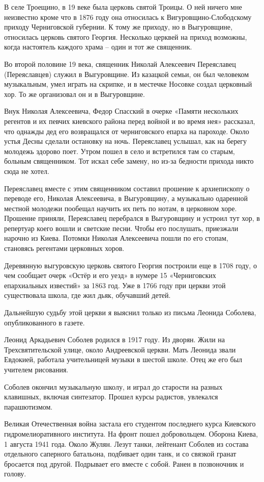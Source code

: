 В селе Троещино, в 19 веке была церковь святой Троицы. О ней ничего мне неизвестно кроме что в 1876 году она относилась к Вигуровщино-Слободскому приходу Черниговской губернии. К тому же приходу, но в Выгуровщине, относилась церковь святого Георгия. Несколько церквей на приход возможны, когда настоятель каждого храма – один и тот же священник.

Во второй половине 19 века, священник Николай Алексеевич Переяславец (Переяславцев) служил в Выгуровщине. Из казацкой семьи, он был человеком музыкальным, умел играть на скрипке, и в местечке Носовке создал церковный хор. То же организовал он и в Выгуровщине. 

Внук Николая Алексеевича, Федор Спасский в очерке «Памяти нескольких регентов и их певчих киевского района перед войной и во время нея» рассказал, что однажды дед его возвращался от черниговского епарха на пароходе. Около устья Десны сделали остановку на ночь. Переяславец услышал, как на берегу молодежь здорово поет. Утром пошел в село и встретился там со старым, больным священником. Тот искал себе замену, но из-за бедности прихода никто сюда не хотел. 

Переяславец вместе с этим священником составил прошение к архиепископу о переводе его, Николая Алексеевича, в Выгуровщину, а музыкально одаренной местной молодежи пообещал научить их петь по нотам, в церковном хоре. Прошение приняли, Переяславец перебрался в Выгуровщину и устроил тут хор, в репертуар коего вошли и светские песни. Чтобы его послушать, приезжали нарочно из Киева. Потомки Николая Алексеевича пошли по его стопам, становясь регентами церковных хоров.

Деревянную выгуровскую церковь святого Георгия построили еще в 1708 году, о чем сообщает очерк «Остёр и его уезд» в нумере 15 «Черниговских епархиальных известий» за 1863 год. Уже в 1766 году при церкви этой существовала школа, где жил дьяк, обучавший детей.

Дальнейшую судьбу этой церкви я выяснил только из письма Леонида Соболева, опубликованного в газете.

Леонид Аркадьевич Соболев родился в 1917 году. Из дворян. Жили на Трехсвятительской улице, около Андреевской церкви. Мать Леонида звали Евдокией, работала учительницей музыки в шестой школе. Отец же его был учителем рисования.

Соболев окончил музыкальную школу, и играл до старости на разных клавишных, включая синтезатор. Прошел курсы радистов, увлекался парашютизмом.

Великая Отечественная война застала его студентом последнего курса Киевского гидромелиоративного института. На фронт пошел добровольцем. Оборона Киева, 1 августа 1941 года. Около Жулян. Лезут танки, лейтенант Соболев из состава отдельного саперного батальона, подбивает один танк, и со связкой гранат бросается под другой. Подрывает его вместе с собой. Ранен в позвоночник и голову.

